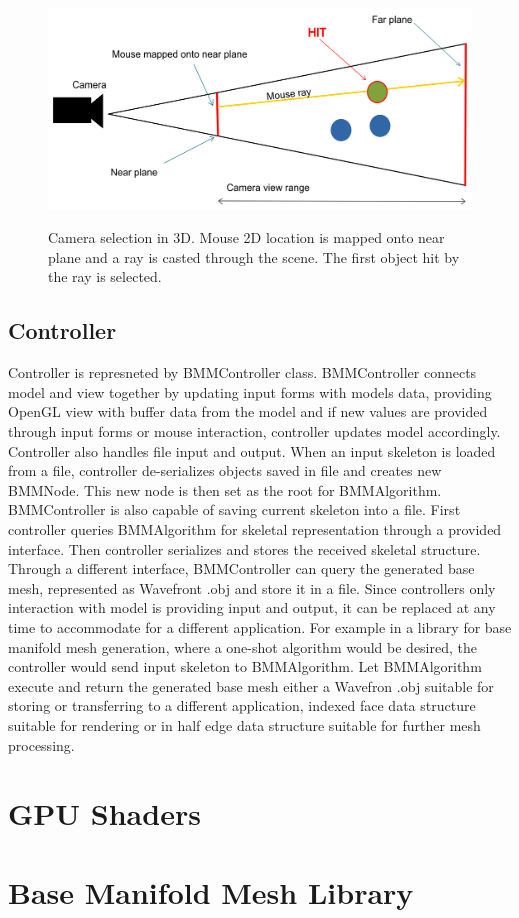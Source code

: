 \begin{figure}[h]
    \centering
    \includegraphics[width=\textwidth]{images/camera_selection}
    \label{fig:camera_selection}
    \caption[Camera selection]{Camera selection in 3D. Mouse 2D location is mapped onto near plane and a ray is casted through the scene. The first object hit by the ray is selected.}
\end{figure}

\subsection{Controller}

Controller is represneted by BMMController class.
BMMController connects model and view together by updating input forms with models data, providing OpenGL view with buffer data from the model and if new values are provided through input forms or mouse interaction, controller updates model accordingly.
Controller also handles file input and output.
When an input skeleton is loaded from a file, controller de-serializes objects saved in file and creates new BMMNode.
This new node is then set as the root for BMMAlgorithm.
BMMController is also capable of saving current skeleton into a file.
First controller queries BMMAlgorithm for skeletal representation through a provided interface.
Then controller serializes and stores the received skeletal structure.
Through a different interface, BMMController can query the generated base mesh, represented as Wavefront .obj and store it in a file.
Since controllers only interaction with model is providing input and output, it can be replaced at any time to accommodate for a different application.
For example in a library for base manifold mesh generation, where a one-shot algorithm would be desired, the controller would  send input skeleton to BMMAlgorithm.
Let BMMAlgorithm execute and return the generated base mesh either a Wavefron .obj suitable for storing or transferring to a different application, indexed face data structure suitable for rendering or in half edge data structure suitable for further mesh processing.

\section{GPU Shaders}

\section{Base Manifold Mesh Library}
